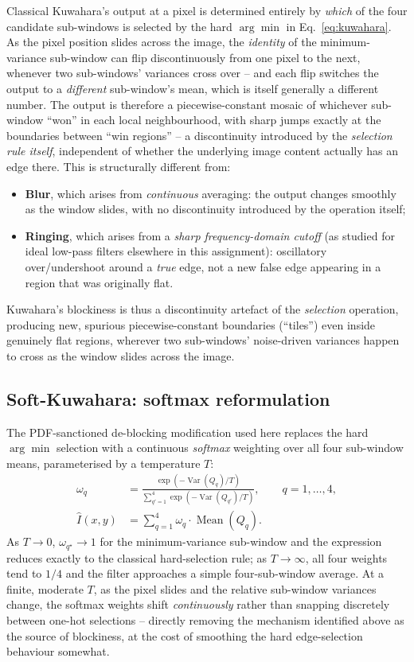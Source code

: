 \documentclass[11pt]{article}
\begin{document}
Classical Kuwahara's output at a pixel is determined entirely by \emph{which} of the
four candidate sub-windows is selected by the hard $\arg\min$ in Eq.~\eqref{eq:kuwahara}.
As the pixel position slides across the image, the \emph{identity} of the
minimum-variance sub-window can flip discontinuously from one pixel to the next,
whenever two sub-windows' variances cross over -- and each flip switches the output to
a \emph{different} sub-window's mean, which is itself generally a different number.
The output is therefore a piecewise-constant mosaic of whichever sub-window ``won'' in
each local neighbourhood, with sharp jumps exactly at the boundaries between
``win regions'' -- a discontinuity introduced by the \emph{selection rule itself},
independent of whether the underlying image content actually has an edge there. This is
structurally different from:
\begin{itemize}[leftmargin=1.5em]
  \item \textbf{Blur}, which arises from \emph{continuous} averaging: the output changes
  smoothly as the window slides, with no discontinuity introduced by the operation
  itself;
  \item \textbf{Ringing}, which arises from a \emph{sharp frequency-domain cutoff}
  (as studied for ideal low-pass filters elsewhere in this assignment): oscillatory
  over/undershoot around a \emph{true} edge, not a new false edge appearing in a region
  that was originally flat.
\end{itemize}
Kuwahara's blockiness is thus a discontinuity artefact of the \emph{selection}
operation, producing new, spurious piecewise-constant boundaries (``tiles'') even
inside genuinely flat regions, wherever two sub-windows' noise-driven variances happen
to cross as the window slides across the image.

\subsection{Soft-Kuwahara: softmax reformulation}

The PDF-sanctioned de-blocking modification used here replaces the hard $\arg\min$
selection with a continuous \emph{softmax} weighting over all four sub-window means,
parameterised by a temperature $T$:
\begin{align}
  \omega_q &= \frac{\exp(-\operatorname{Var}(Q_q)/T)}{\sum_{q'=1}^{4}\exp(-\operatorname{Var}(Q_{q'})/T)},
  \qquad q=1,\dots,4, \\
  \hat I(x,y) &= \sum_{q=1}^{4} \omega_q \cdot \operatorname{Mean}(Q_q).
  \label{eq:softkuwahara}
\end{align}
As $T\to 0$, $\omega_{q^\star}\to 1$ for the minimum-variance sub-window and the
expression reduces exactly to the classical hard-selection rule; as $T\to\infty$, all
four weights tend to $1/4$ and the filter approaches a simple four-sub-window average.
At a finite, moderate $T$, as the pixel slides and the relative sub-window variances
change, the softmax weights shift \emph{continuously} rather than snapping discretely
between one-hot selections -- directly removing the mechanism identified above as the
source of blockiness, at the cost of smoothing the hard edge-selection behaviour
somewhat.
\end{document}
